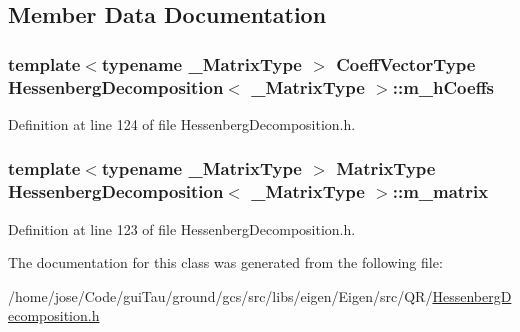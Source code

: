 \subsection{Member Data Documentation}
\hypertarget{class_hessenberg_decomposition_af1430f03174c334db69c53ee9f7185a5}{
\subsubsection[{m\-\_\-h\-Coeffs}]{\setlength{\rightskip}{0pt plus 5cm}template$<$typename \-\_\-\-Matrix\-Type $>$ {\bf Coeff\-Vector\-Type} {\bf Hessenberg\-Decomposition}$<$ \-\_\-\-Matrix\-Type $>$\-::m\-\_\-h\-Coeffs\hspace{0.3cm}{\ttfamily [protected]}}}\label{class_hessenberg_decomposition_af1430f03174c334db69c53ee9f7185a5}


Definition at line 124 of file Hessenberg\-Decomposition.\-h.

\hypertarget{class_hessenberg_decomposition_aa85a12d4f4be86b009bc76fb78bc446e}{
\subsubsection[{m\-\_\-matrix}]{\setlength{\rightskip}{0pt plus 5cm}template$<$typename \-\_\-\-Matrix\-Type $>$ {\bf Matrix\-Type} {\bf Hessenberg\-Decomposition}$<$ \-\_\-\-Matrix\-Type $>$\-::m\-\_\-matrix\hspace{0.3cm}{\ttfamily [protected]}}}\label{class_hessenberg_decomposition_aa85a12d4f4be86b009bc76fb78bc446e}


Definition at line 123 of file Hessenberg\-Decomposition.\-h.



The documentation for this class was generated from the following file\-:\begin{DoxyCompactItemize}
\item 
/home/jose/\-Code/gui\-Tau/ground/gcs/src/libs/eigen/\-Eigen/src/\-Q\-R/\hyperlink{_hessenberg_decomposition_8h}{Hessenberg\-Decomposition.\-h}\end{DoxyCompactItemize}
